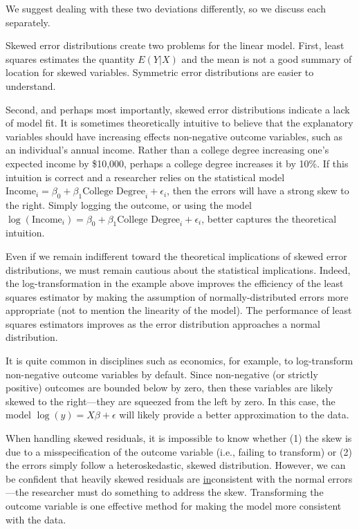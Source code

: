 \documentclass[12pt]{article}
\begin{document}
We suggest dealing with these two deviations differently, so we discuss each separately.

Skewed error distributions create two problems for the linear model. 
First, least squares estimates the quantity $E(Y | X)$ and the mean is not a good summary of location for skewed variables. 
Symmetric error distributions are easier to understand. 

Second, and perhaps most importantly, skewed error distributions indicate a lack of model fit. 
It is sometimes theoretically intuitive to believe that the explanatory variables should have increasing effects non-negative outcome variables, such as an individual's annual income. 
Rather than a college degree increasing one's expected income by \$10,000, perhaps a college degree increases it by 10\%. 
If this intuition is correct and a researcher relies on the statistical model $\text{Income}_i = \beta_0 + \beta_1 \text{College Degree}_i + \epsilon_i$, then the errors will have a strong skew to the right. Simply logging the outcome, or using the model $\log (\text{Income}_i) = \beta_0 + \beta_1 \text{College Degree}_i + \epsilon_i$, better captures the theoretical intuition.

Even if we remain indifferent toward the theoretical implications of skewed error distributions, we must remain cautious about the statistical implications. 
Indeed, the log-transformation in the example above improves the efficiency of the least squares estimator by making the assumption of normally-distributed errors more appropriate (not to mention the linearity of the model).
The performance of least squares estimators improves as the error distribution approaches a normal distribution. 

It is quite common in disciplines such as economics, for example, to log-transform non-negative outcome variables by default. 
Since non-negative (or strictly positive) outcomes are bounded below by zero, then these variables are likely skewed to the right---they are squeezed from the left by zero. 
In this case, the model $\log(y) = X\beta + \epsilon$ will likely provide a better approximation to the data.

When handling skewed residuals, it is impossible to know whether (1) the skew is due to a misspecification of the outcome variable (i.e., failing to transform) or (2) the errors simply follow a heteroskedastic, skewed distribution. 
However, we can be confident that heavily skewed residuals are \underline{in}consistent with the normal errors---the researcher must do something to address the skew.
Transforming the outcome variable is one effective method for making the model more consistent with the data.
\end{document}
